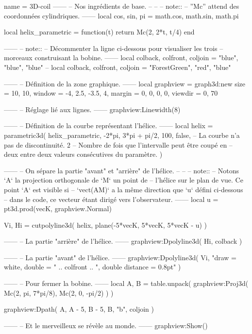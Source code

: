 \documentclass[varwidth]{standalone}
\begin{document}
\begin{luadraw}{name = 3D-coil}
------
-- Nos ingrédients de base.
--
--
-- note::
--     ''Mc'' attend des coordonnées cylindriques.
------
local cos, sin, pi = math.cos, math.sin, math.pi

local helix_parametric = function(t)
  return Mc(2, 2*t, t/4)
end

------
-- note::
--     Décommenter la ligne ci-dessous pour visualiser les trois
--     morceaux construisant la bobine.
------
local colback, colfront, coljoin = "blue", "blue", "blue"
-- local colback, colfront, coljoin = "ForestGreen", "red", "blue"

------
-- Définition de la zone graphique.
------
local graphview = graph3d:new{
  size    = {10, 10},
  window  = {-4, 2.5, -3.5, 4},
  margin  = {0, 0, 0, 0},
  viewdir = {0, 70}
}

------
-- Réglage lié aux lignes.
------
graphview:Linewidth(8)

------
-- Définition de la courbe représentant l'hélice.
------
local helix = parametric3d(
  helix_parametric,
  -2*pi, 3*pi + pi/2,
  100,
  false,  -- La courbe n'a pas de discontinuité.
  2       -- Nombre de fois que l’intervalle peut être coupé en
          -- deux entre deux valeurs consécutives du paramètre.
)

------
-- On sépare la partie "avant" et "arrière" de l'hélice.
--
--
-- note::
--     Notons `A` la projection orthogonale de `M` un point de
--     l’hélice sur le plan de vue. Ce point `A` est visible si
--     `vect(AM)` a la même direction que `u` défini ci-dessous
--     dans le code, ce vecteur étant dirigé vers l’observateur.
------
local u = pt3d.prod(vecK, graphview.Normal)

Vi, Hi = cutpolyline3d(
  helix,
  plane(-5*vecK, 5*vecK, 5*vecK - u)
)

------
-- La partie "arrière" de l'hélice.
------
graphview:Dpolyline3d(
  Hi,
  colback
)

------
-- La partie "avant" de l'hélice.
------
graphview:Dpolyline3d(
  Vi,
     "draw = white, double = "
  .. colfront
  .. ", double distance = 0.8pt"
)

------
-- Pour fermer la bobine.
------
local A, B = table.unpack(
  graphview:Proj3d({
    Mc(2, pi, 7*pi/8),
    Mc(2, 0, -pi/2)
  })
)

graphview:Dpath(
  {A, A - 5, B - 5, B, "b"},
  coljoin
)

------
-- Et le merveilleux se révèle au monde.
------
graphview:Show()
\end{luadraw}
\end{document}
